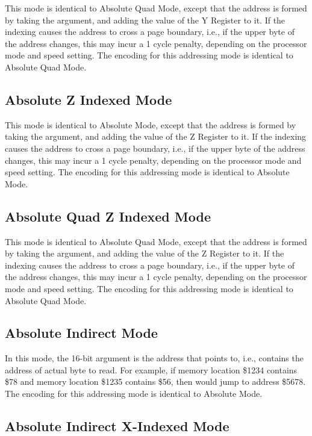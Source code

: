This mode is identical to Absolute Quad Mode, except that the address is formed by taking the
argument, and adding the value of the Y Register to it.  If the indexing causes the address
to cross a page boundary, i.e., if the upper byte of the address changes, this may incur a
1 cycle penalty, depending on the processor mode and speed setting.
The encoding for this addressing mode is identical to Absolute Quad Mode.

\subsection{Absolute Z Indexed Mode}

This mode is identical to Absolute Mode, except that the address is formed by taking the
argument, and adding the value of the Z Register to it.  If the indexing causes the address
to cross a page boundary, i.e., if the upper byte of the address changes, this may incur a
1 cycle penalty, depending on the processor mode and speed setting.
The encoding for this addressing mode is identical to Absolute Mode.

\subsection{Absolute Quad Z Indexed Mode}

This mode is identical to Absolute Quad Mode, except that the address is formed by taking the
argument, and adding the value of the Z Register to it.  If the indexing causes the address
to cross a page boundary, i.e., if the upper byte of the address changes, this may incur a
1 cycle penalty, depending on the processor mode and speed setting.
The encoding for this addressing mode is identical to Absolute Quad Mode.

\subsection{Absolute Indirect Mode}

In this mode, the 16-bit argument is the address that points to, i.e., contains the
address of actual byte to read.  For example, if memory location \$1234 contains \$78
and memory location \$1235 contains \$56, then  would jump
to address \$5678.  The encoding for this addressing mode is identical to Absolute Mode.

\subsection{Absolute Indirect X-Indexed Mode}

